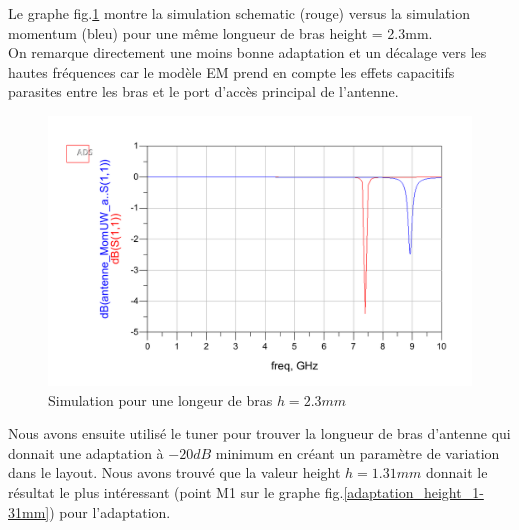 \documentclass[a4paper]{article}
\begin{document}
Le graphe fig.\ref{height_2_3mm} montre la simulation schematic (rouge) versus la simulation momentum (bleu) pour une m\^eme longueur
de bras height = 2.3mm. \\
On remarque directement une moins bonne adaptation et un d\'ecalage vers les hautes fr\'equences
car le mod\`ele EM prend en compte les effets capacitifs parasites entre les bras et le port d'acc\`es principal de l'antenne.
\clearpage
\begin{figure}[!htb]
\begin{center}
  \includegraphics[scale=0.45]{height_2_3mm.png}
  \caption{Simulation pour une longeur de bras $h = 2.3 mm$}
  \label{height_2_3mm}
\end{center}
\end{figure}

Nous avons ensuite utilis\'e le tuner pour trouver la longueur de bras d'antenne qui donnait une adaptation \`a $-20dB$ minimum en cr\'eant un param\`etre de variation dans le layout.
Nous avons trouv\'e que la valeur height $h = 1.31 mm$ donnait le r\'esultat le plus int\'eressant (point M1 sur le graphe fig.\ref{adaptation_height_1-31mm}) pour l'adaptation.
\end{document}
